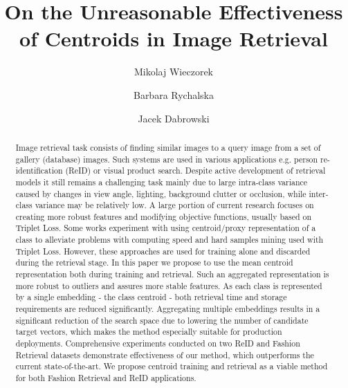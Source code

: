\documentclass[sigconf,nonacm]{acmart}
\begin{document}
\title{On the Unreasonable Effectiveness of Centroids in Image Retrieval}


\author{Mikolaj Wieczorek}

\author{Barbara Rychalska\footnotemark[1]}

\author{Jacek Dabrowski}

\renewcommand{\shortauthors}{M. Wieczorek et al.}

\begin{abstract}
Image retrieval task consists of finding similar images to a query image from a set of gallery (database) images. Such systems are used in various applications e.g. person re-identification (ReID) or visual product search. 
Despite active development of retrieval models it still remains a challenging task mainly due to large intra-class variance caused by changes in view angle, lighting, background clutter or occlusion, while inter-class variance may be relatively low.
A large portion of current research focuses on creating more robust features and modifying objective functions, usually based on Triplet Loss. Some works experiment with using centroid/proxy representation of a class to alleviate problems with computing speed and hard samples mining used with Triplet Loss. However, these approaches are used for training alone and discarded during the retrieval stage. In this paper we propose to use the mean centroid representation both during training and retrieval. Such an aggregated representation is more robust to outliers and assures more stable features. As each class is represented by a single embedding - the class centroid - both retrieval time and storage requirements are reduced significantly. Aggregating multiple embeddings results in a significant reduction of the search space due to lowering the number of candidate target vectors, which makes the method especially suitable for production deployments. Comprehensive experiments conducted on two ReID and Fashion Retrieval datasets demonstrate effectiveness of our method, which outperforms the current state-of-the-art. We propose centroid training and retrieval as a viable method for both Fashion Retrieval and ReID applications.
\end{abstract}
\end{document}

